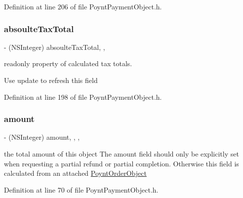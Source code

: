 Definition at line 206 of file Poynt\+Payment\+Object.\+h.

\hypertarget{interface_poynt_payment_object_a94b92d7e18d94d33330a7549e345c0eb}{}\label{interface_poynt_payment_object_a94b92d7e18d94d33330a7549e345c0eb} 
\subsubsection{\texorpdfstring{absoulte\+Tax\+Total}{absoulteTaxTotal}}
{\footnotesize\ttfamily -\/ (N\+S\+Integer) absoulte\+Tax\+Total\hspace{0.3cm}{\ttfamily [read]}, {\ttfamily [nonatomic]}, {\ttfamily [assign]}}



readonly property of calculated tax totals. 

Use update to refresh this field 

Definition at line 198 of file Poynt\+Payment\+Object.\+h.

\hypertarget{interface_poynt_payment_object_a6ff5079a7aa518c578773da69959732d}{}\label{interface_poynt_payment_object_a6ff5079a7aa518c578773da69959732d} 
\subsubsection{\texorpdfstring{amount}{amount}}
{\footnotesize\ttfamily -\/ (N\+S\+Integer) amount\hspace{0.3cm}{\ttfamily [read]}, {\ttfamily [write]}, {\ttfamily [nonatomic]}, {\ttfamily [assign]}}



the total amount of this object  The amount field should only be explicitly set when requesting a partial refund or partial completion. Otherwise this field is calculated from an attached \hyperlink{interface_poynt_order_object}{Poynt\+Order\+Object} 



Definition at line 70 of file Poynt\+Payment\+Object.\+h.

\hypertarget{interface_poynt_payment_object_a24782f14a239c62d29bf0389fb7fdf8d}{}\label{interface_poynt_payment_object_a24782f14a239c62d29bf0389fb7fdf8d} 
